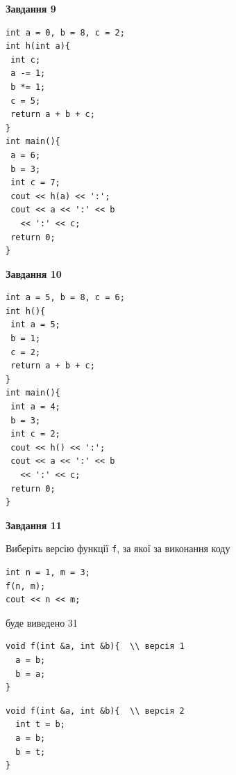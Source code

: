 \documentclass[12pt, ukrainian]{article}
\def\code#1{\Verb!#1!}
\begin{document}
{\begin {large}
\begin{minipage}[t]{11.0cm}
\end{minipage}


\begin{minipage}[t]{7.0cm}

\begin{center}
\textbf{Завдання 9}
\end{center}
\vspace{-8mm}

\begin{verbatim}
int a = 0, b = 8, c = 2;
int h(int a){
 int c;
 a -= 1;
 b *= 1;
 c = 5;
 return a + b + c;
}
int main(){
 a = 6;
 b = 3;
 int c = 7;
 cout << h(a) << ':';
 cout << a << ':' << b 
   << ':' << c;
 return 0;
}
\end{verbatim}



\begin{center}
\textbf{Завдання 10}
\end{center}
\vspace{-8mm}

\begin{verbatim}
int a = 5, b = 8, c = 6;
int h(){
 int a = 5;
 b = 1;
 c = 2;
 return a + b + c;
}
int main(){
 int a = 4;
 b = 3;
 int c = 2;
 cout << h() << ':';
 cout << a << ':' << b 
   << ':' << c;
 return 0;
}
\end{verbatim}

\end{minipage}
\vline \hspace{1mm}
\begin{minipage}[t]{11.0cm}

\begin{center}
\textbf{Завдання 11}
\end{center}
Виберіть версію функції \code{f}, за якої за виконання коду
\begin{verbatim}
int n = 1, m = 3;
f(n, m);
cout << n << m;
\end{verbatim}

буде виведено 31

\begin{verbatim}
void f(int &a, int &b){  \\ версія 1
  a = b;
  b = a;
}
\end{verbatim}

\vspace{-8mm}\begin{verbatim}
void f(int &a, int &b){  \\ версія 2
  int t = b;
  a = b;
  b = t;
}
\end{verbatim}


\end{minipage}
\end{large}}
\end{document}
